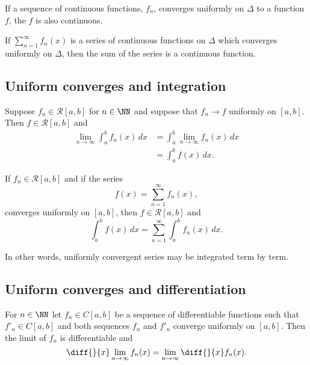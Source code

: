 \documentclass[12pt, a4paper]{article}
\begin{document}
\begin{mdthm}
    If a sequence of continuous functions, \(f_n\), converges uniformly on \(\Delta\) to a function \(f\), the \(f\) is also continuous.
\end{mdthm}

\begin{corollary}
    If \(\sum_{n=1}^{\infty} f_n(x)\) is a series of continuous functions on \(\Delta\) which converges uniformly on \(\Delta\), then the sum of the series is a continuous function.
\end{corollary}

\subsection{Uniform converges and integration}

\begin{mdthm}
    Suppose \(f_n \in \mathcal{R}[a,b]\) for \(n \in \NN\) and suppose that \(f_n \to f\) uniformly on \([a,b]\). Then \(f \in \mathcal{R}[a,b]\) and 
    \[\begin{aligned}
        \lim_{n\to \infty} \int_{a}^{b} f_n(x) \, dx &= \int_{a}^{b} \lim_{n\to \infty}f_n(x) \, dx \\
        &= \int_{a}^{b} f(x) \, dx.
    \end{aligned}\]
\end{mdthm}

\begin{mdcor}
    If \(f_n \in \mathcal{R}[a,b]\) and if the series 
    \[f(x)=\sum_{n=1}^{\infty} f_n(x),\]
    converges uniformly on \([a,b]\), then \(f \in \mathcal{R}[a,b]\) and 
    \[\int_{a}^{b} f(x) \, dx =\sum_{n=1}^{\infty} \int_{a}^{b} f_n(x) \, dx.\]
\end{mdcor}

\begin{mdnote}
    In other words, uniformly convergent series may be integrated term by term.
\end{mdnote}

\subsection{Uniform converges and differentiation}

\begin{mdthm}
    For \(n\in \NN\) let \(f_n \in C[a,b]\) be a sequence of differentiable functions such that \(f'_n \in C[a,b]\) and both sequences \(f_n\) and \(f'_n\) converge uniformly on \([a,b]\). Then the limit of \(f_n\) is differentiable and 
    \[\diff{}{x} \lim_{n\to \infty} f_n(x) =\lim_{n\to \infty}\diff{}{x}f_n(x).\]
\end{mdthm}
\end{document}
